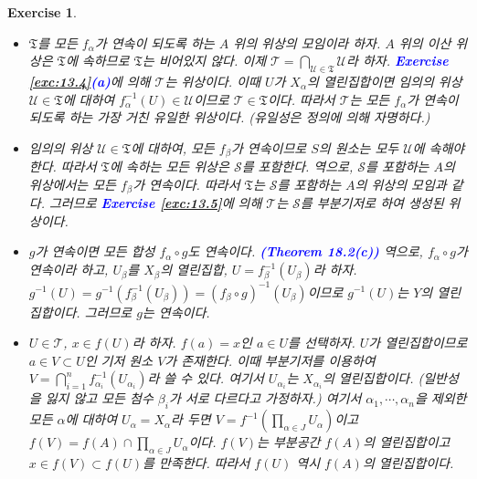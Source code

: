 \documentclass{article}
\newtheorem{exercise}{Exercise}[section]
\begin{document}
\begin{exercise}
	\label{exc:19.10}
    \phantom{}
    \begin{itemize}
        \item[(a)] $\mathfrak T$를 모든 $f_\alpha$가 연속이 되도록 하는 $A$ 위의 위상의 모임이라 하자. $A$ 위의 이산 위상은 $\mathfrak T$에 속하므로 $\mathfrak T$는 비어있지 않다. 이제 $\mathcal T=\bigcap_{\mathcal U\in\mathfrak T}\mathcal U$라 하자. \textcolor{blue}{\textbf{Exercise \ref{exc:13.4}(a)}}에 의해 $\mathcal T$는 위상이다. 이때 $U$가 $X_\alpha$의 열린집합이면 임의의 위상 $\mathcal U\in\mathfrak T$에 대하여 $f_\alpha^{-1}(U)\in\mathcal U$이므로 $\mathcal T\in\mathfrak T$이다. 따라서 $\mathcal T$는 모든 $f_\alpha$가 연속이 되도록 하는 가장 거친 유일한 위상이다. (유일성은 정의에 의해 자명하다.)
        \item[(b)] 임의의 위상 $\mathcal U\in\mathfrak T$에 대하여, 모든 $f_\beta$가 연속이므로 $S$의 원소는 모두 $\mathcal U$에 속해야 한다. 따라서 $\mathfrak T$에 속하는 모든 위상은 $\mathcal S$를 포함한다. 역으로, $\mathcal S$를 포함하는 $A$의 위상에서는 모든 $f_\beta$가 연속이다. 따라서 $\mathfrak T$는 $\mathcal S$를 포함하는 $A$의 위상의 모임과 같다. 그러므로 \textcolor{blue}{\textbf{Exercise \ref{exc:13.5}}}에 의해 $\mathcal T$는 $\mathcal S$를 부분기저로 하여 생성된 위상이다.
        \item[(c)] $g$가 연속이면 모든 합성 $f_\alpha\circ g$도 연속이다. \textcolor{blue}{\textbf{(Theorem 18.2(c))}} 역으로, $f_\alpha\circ g$가 연속이라 하고, $U_\beta$를 $X_\beta$의 열린집합, $U=f_\beta^{-1}(U_\beta)$라 하자. $g^{-1}(U)=g^{-1}(f_\beta^{-1}(U_\beta))=(f_\beta\circ g)^{-1}(U_\beta)$이므로 $g^{-1}(U)$는 $Y$의 열린집합이다. 그러므로 $g$는 연속이다.
        \item[(d)] $U\in\mathcal T$, $x\in f(U)$라 하자. $f(a)=x$인 $a\in U$를 선택하자. $U$가 열린집합이므로 $a\in V\subset U$인 기저 원소 $V$가 존재한다. 이때 부분기저를 이용하여 $V=\bigcap_{i=1}^nf_{\alpha_i}^{-1}(U_{\alpha_i})$라 쓸 수 있다. 여기서 $U_{\alpha_i}$는 $X_{\alpha_i}$의 열린집합이다. (일반성을 잃지 않고 모든 첨수 $\beta_i$가 서로 다르다고 가정하자.) 여기서 $\alpha_1,\cdots,\alpha_n$을 제외한 모든 $\alpha$에 대하여 $U_\alpha=X_\alpha$라 두면 $V=f^{-1}(\prod_{\alpha\in J}U_\alpha)$이고 $f(V)=f(A)\cap\prod_{\alpha\in J}U_\alpha$이다. $f(V)$는 부분공간 $f(A)$의 열린집합이고 $x\in f(V)\subset f(U)$를 만족한다. 따라서 $f(U)$ 역시 $f(A)$의 열린집합이다.
    \end{itemize}
\end{exercise}
\end{document}
